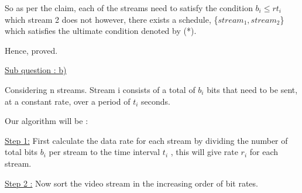 \documentclass[letterpaper,portrait,12pt]{article}
\begin{document}
\begin{flushleft}

\end{flushleft}


\begin{flushleft}
So as per the claim, each of the streams need to satisfy the condition $b_i \le rt_i$ which stream 2 does not however, there exists a schedule, \{${stream}_1, {stream}_2$\} which satisfies the ultimate condition denoted by (*).
\end{flushleft}


\begin{flushleft}
Hence, proved.
\end{flushleft}


\begin{flushleft}

\end{flushleft}


\begin{flushleft}
\uline{Sub ques}\uline{tion : b)}
\end{flushleft}


\begin{flushleft}

\end{flushleft}


\begin{flushleft}
Considering n streams. Stream i consists of a total of $b_i$ bits that need to be sent, at a constant rate, over a period of $t_i$ seconds.
\end{flushleft}


\begin{flushleft}

\end{flushleft}


\begin{flushleft}
Our algorithm will be :
\end{flushleft}


\begin{flushleft}
\uline{Step 1:} First calculate the data rate for each stream by dividing the number of total bits $b_i$ per stream to the time interval $t_i$ , this will give rate $r_i$ for each stream.
\end{flushleft}


\begin{flushleft}

\end{flushleft}


\begin{flushleft}
\uline{Step }\uline{2 :} Now sort the video stream in the increasing order of bit rates. 
\end{flushleft}
\end{document}
